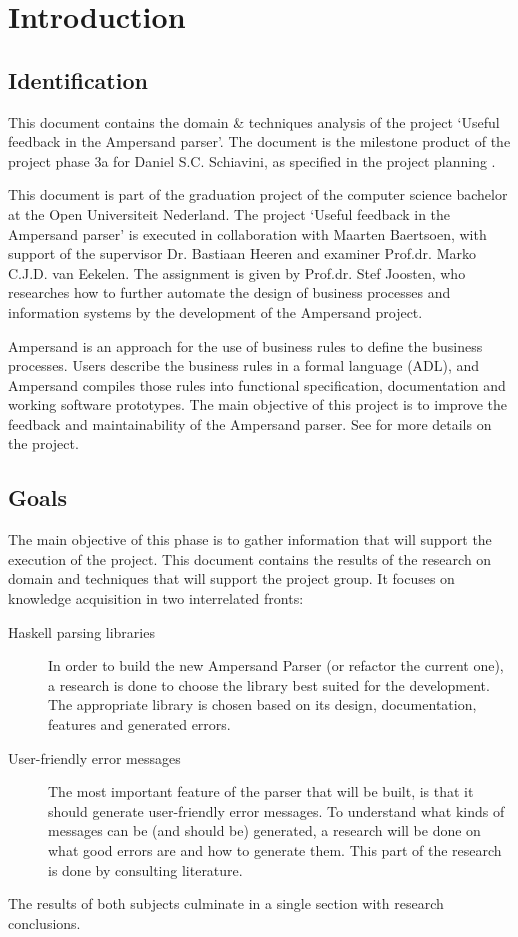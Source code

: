 \section{Introduction}
\subsection{Identification}
This document contains the domain \& techniques analysis of the project `Useful feedback in the Ampersand parser'.
The document is the milestone product of the project phase 3a for Daniel S.C. Schiavini, as specified in the project planning \cite{plan}.

This document is part of the graduation project of the computer science bachelor at the Open Universiteit Nederland.
The project `Useful feedback in the Ampersand parser' is executed in collaboration with Maarten Baertsoen, with support of the supervisor Dr. Bastiaan Heeren and examiner Prof.dr. Marko C.J.D. van Eekelen.
The assignment is given by Prof.dr. Stef Joosten, who researches how to further automate the design of business processes and information systems by the development of the Ampersand project.

Ampersand is an approach for the use of business rules to define the business processes.
Users describe the business rules in a formal language (ADL), and Ampersand compiles those rules into functional specification, documentation and working software
prototypes.
The main objective of this project is to improve the feedback and maintainability of the Ampersand parser.
See \cite{plan} for more details on the project.

\subsection{Goals}
The main objective of this phase is to gather information that will support the execution of the project.
This document contains the results of the research on domain and techniques that will support the project group.
It focuses on knowledge acquisition in two interrelated fronts:
\begin{description}
	\item[Haskell parsing libraries]
	In order to build the new Ampersand Parser (or refactor the current one), a research is done to choose the library best suited for the development.
	The appropriate library is chosen based on its design, documentation, features and generated errors.
	
	\item[User-friendly error messages]
	The most important feature of the parser that will be built, is that it should generate user-friendly error messages.
	To understand what kinds of messages can be (and should be) generated, a research will be done on what good errors are and how to generate them.
	This part of the research is done by consulting literature.
\end{description}
%
The results of both subjects culminate in a single section with research conclusions.

